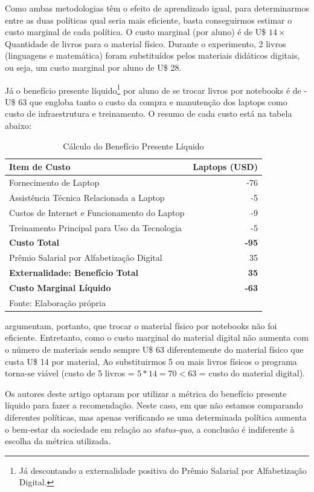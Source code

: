 \documentclass[12pt,letterpaper]{article}
\newcommand{\1}{\mathbbm{1}}
\numberwithin{equation}{section}
\begin{document}
Como ambas metodologias têm o efeito de aprendizado igual, para determinarmos entre as duas políticas qual seria mais eficiente, basta conseguirmos estimar o custo marginal de cada política. O custo marginal (por aluno) é de U\$ $14 \times$ Quantidade de livros para o material físico. Durante o experimento, 2 livros (linguagens e matemática) foram substituídos pelos materiais didáticos digitais, ou seja, um custo marginal por aluno de U\$ 28.

Já o benefício presente líquido\footnote{Já descontando a externalidade positiva do Prêmio Salarial por Alfabetização Digital.} por aluno de se trocar livros por notebooks é de - U\$ 63 que engloba tanto o custo da compra e manutenção dos laptops como custo de infraestrutura e treinamento. O resumo de cada custo está na tabela abaixo:

\begin{table}[h]
\centering
\begin{tabular}{l|r}
\hline
\textbf{Item de Custo} & \textbf{Laptops (USD)} \\
\hline
Fornecimento de Laptop & -76 \\
Assistência Técnica Relacionada a Laptop & -5 \\
Custos de Internet e Funcionamento do Laptop & -9 \\
Treinamento Principal para Uso da Tecnologia & -5 \\
\hline
\textbf{Custo Total} & \textbf{-95} \\
\hline
Prêmio Salarial por Alfabetização Digital & 35 \\
\hline
\textbf{Externalidade: Benefício Total} & \textbf{35} \\
\hline
\textbf{Custo Marginal Líquido} & \textbf{-63} \\
\hline
\multicolumn{2}{l}{Fonte: Elaboração própria} \\
\end{tabular}
\caption{Cálculo do Benefício Presente Líquido}
\end{table}

\textcite{bando2016books} argumentam, portanto, que trocar o material físico por notebooks não foi eficiente. Entretanto, como o custo marginal do material digital não aumenta com o número de materiais sendo sempre U\$ 63 diferentemente do material físico que custa U\$ 14 por material, Ao substituirmos 5 ou mais livros físicos o programa torna-se viável (custo de 5 livros = $5*14 = 70 < 63$ = custo do material digital).

Os autores deste artigo optaram por utilizar a métrica do benefício presente líquido para fazer a recomendação. Neste caso, em que não estamos comparando diferentes políticas, mas apenas verificando se uma determinada política aumenta o bem-estar da sociedade em relação ao \textit{status-quo}, a conclusão é indiferente à escolha da métrica utilizada.
\end{document}
